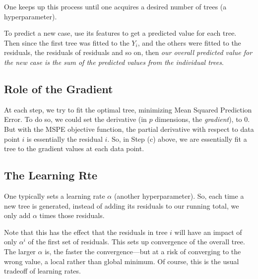 One keeps up this process until one acquires a desired number of trees
(a hyperparameter).  

To predict a new case, use its features to get a predicted value for
each tree.  Then since the first tree was fitted to the $Y_i$, and the
others were fitted to the residuals, the residuals of residuals and so
on, then \textit{our overall predicted value for the new case is the sum
of the predicted values from the individual trees}.

% 
% 
% 
% 

\subsection{Role of the Gradient}

At each step, we try to fit the optimal tree, minimizing Mean
Squared Prediction Error.  To do so, we could set the derivative (in $p$ 
dimensions, the \textit{gradient}), to 0.  But with the MSPE objective
function, the partial derivative with respect to data point $i$
is essentially the residual $i$.  So, in Step (c) above, we are
essentially fit a tree to the gradient values at each data point.

\subsection{The Learning Rte}

One typically sets a learning rate $\alpha$ (another hyperparameter).
So, each time a new tree is generated, instead of adding its residuals
to our running total, we only add $\alpha$ times those residuals.  

Note that this has the effect that the residuals in tree $i$ will have
an impact of only $\alpha^i$ of the first set of residuals.  This sets
up convergence of the overall tree.  The larger $\alpha$ is, the faster
the convergence---but at a risk of converging to the wrong value, a
local rather than global minimum.  Of course, this is the usual tradeoff
of learning rates.

